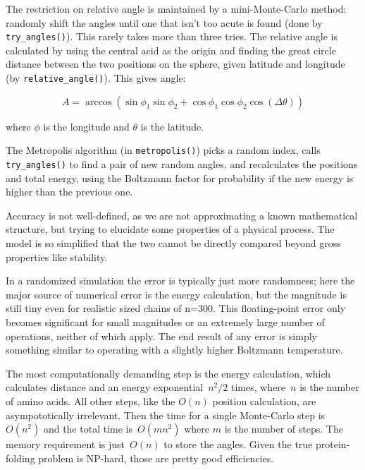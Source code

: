 \documentclass{article}
\begin{document}
	The restriction on relative angle is maintained by a mini-Monte-Carlo method: randomly shift the angles until one that isn't too acute is found (done by \texttt{try\_angles()}). This rarely takes more than three tries. The relative angle is calculated by using the central acid as the origin and finding the great circle distance between the two positions on the sphere, given latitude and longitude (by \texttt{relative\_angle()}). This gives angle:

	\begin{equation}
		A = \arccos (\sin \phi_1 \sin \phi_2 + \cos \phi_1 \cos \phi_2 \cos (\Delta \theta))
	\end{equation}

	where $\phi$ is the longitude and $\theta$ is the latitude. 

	The Metropolis algorithm (in \texttt{metropolis()}) picks a random index, calls \texttt{try\_angles()} to find a pair of new random angles, and recalculates the positions and total energy, using the Boltzmann factor for probability if the new energy is higher than the previous one.

	Accuracy is not well-defined, as we are not approximating a known mathematical structure, but trying to elucidate some properties of a physical process. The model is so simplified that the two cannot be directly compared beyond gross properties like stability.

	In a randomized simulation the error is typically just more randomness; here the major source of numerical error is the energy calculation, but the magnitude is still tiny even for realistic sized chains of n=300. This floating-point error only becomes significant for small magnitudes or an extremely large number of operations, neither of which apply. The end result of any error is simply something similar to operating with a slightly higher Boltzmann temperature.

	The most computationally demanding step is the energy calculation, which calculates distance and an energy exponential~$n^2/2$ times, where~$n$ is the number of amino acids. All other steps, like the $O(n)$ position calculation, are asympototically irrelevant. Then the time for a single Monte-Carlo step is~$O(n^2)$ and the total time is~$O(m n^2)$ where $m$ is the number of steps. The memory requirement is just~$O(n)$ to store the angles. Given the true protein-folding problem is NP-hard, those are pretty good efficiencies.
\end{document}
